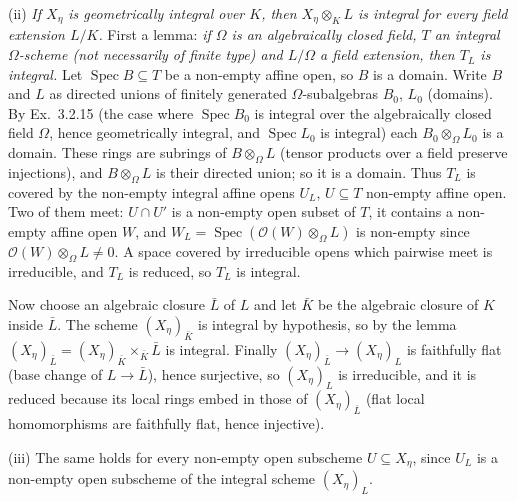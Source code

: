 \documentclass[11pt]{article}
\begin{document}
(ii) \emph{If $X_\eta$ is geometrically integral over $K$, then $X_\eta\otimes_KL$ is integral for every field extension $L/K$.} First a lemma: \emph{if $\Omega$ is an algebraically closed field, $T$ an integral $\Omega$-scheme (not necessarily of finite type) and $L/\Omega$ a field extension, then $T_L$ is integral.} Let $\operatorname{Spec}B\subseteq T$ be a non-empty affine open, so $B$ is a domain. Write $B$ and $L$ as directed unions of finitely generated $\Omega$-subalgebras $B_0$, $L_0$ (domains). By Ex.~3.2.15 (the case where $\operatorname{Spec}B_0$ is integral over the algebraically closed field $\Omega$, hence geometrically integral, and $\operatorname{Spec}L_0$ is integral) each $B_0\otimes_\Omega L_0$ is a domain. These rings are subrings of $B\otimes_\Omega L$ (tensor products over a field preserve injections), and $B\otimes_\Omega L$ is their directed union; so it is a domain. Thus $T_L$ is covered by the non-empty integral affine opens $U_L$, $U\subseteq T$ non-empty affine open. Two of them meet: $U\cap U'$ is a non-empty open subset of $T$, it contains a non-empty affine open $W$, and $W_L=\operatorname{Spec}(\mathcal O(W)\otimes_\Omega L)$ is non-empty since $\mathcal O(W)\otimes_\Omega L\neq0$. A space covered by irreducible opens which pairwise meet is irreducible, and $T_L$ is reduced, so $T_L$ is integral.

Now choose an algebraic closure $\bar L$ of $L$ and let $\bar K$ be the algebraic closure of $K$ inside $\bar L$. The scheme $(X_\eta)_{\bar K}$ is integral by hypothesis, so by the lemma $(X_\eta)_{\bar L}=(X_\eta)_{\bar K}\times_{\bar K}\bar L$ is integral. Finally $(X_\eta)_{\bar L}\to(X_\eta)_L$ is faithfully flat (base change of $L\to\bar L$), hence surjective, so $(X_\eta)_L$ is irreducible, and it is reduced because its local rings embed in those of $(X_\eta)_{\bar L}$ (flat local homomorphisms are faithfully flat, hence injective).

(iii) The same holds for every non-empty open subscheme $U\subseteq X_\eta$, since $U_L$ is a non-empty open subscheme of the integral scheme $(X_\eta)_L$.
\end{document}
